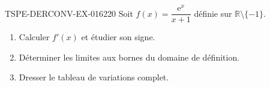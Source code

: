 \begin{exercice}{TSPE-DERCONV-EX-016}{2}{20}
Soit $f(x) = \dfrac{\mathrm{e}^x}{x+1}$ définie sur $\mathbb{R} \setminus \{-1\}$.
\begin{enumerate}
  \item Calculer $f'(x)$ et étudier son signe.
  \item Déterminer les limites aux bornes du domaine de définition.
  \item Dresser le tableau de variations complet.
\end{enumerate}

\end{exercice}
